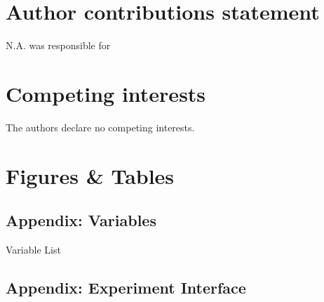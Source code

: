 \documentclass[fleqn,10pt]{wlscirep}
\begin{document}
\section*{Author contributions statement}

N.A. was responsible for 


\section*{Competing interests} 

The authors declare no competing interests.


\clearpage

\section*{Figures \& Tables}



\clearpage

\subsection*{Appendix: Variables \label{subsec:Appendix:-Variables} }

\begin{table}[H]
\caption{Variable List}

\end{table}

\clearpage

\subsection*{Appendix: Experiment Interface \label{subsec:Appendix:-Experiment-Interface}}


\end{document}
